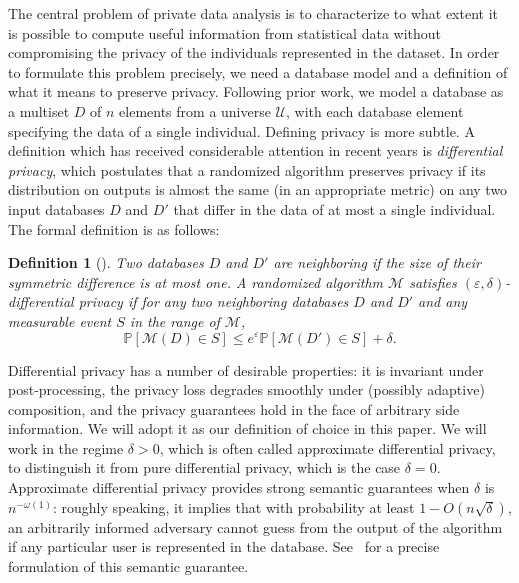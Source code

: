 \documentclass{article}
\newtheorem{definition}{Definition}[section]
\def\Pr{{\mathbb{P}}} \def\bin{{\rm bin}}
\newcommand{\alg}{\mathcal{M}}
\newcommand{\eps}{\varepsilon}
\newcommand{\univ}{U}
\newcommand\junk[1]{}
\renewcommand{\univ}{\mathcal{U}}
\begin{document}
The central problem of private data analysis is to characterize to
what extent it is possible to compute useful information from
statistical data without compromising the privacy of the individuals
represented in the dataset. In order to formulate this problem
precisely, we need a database model and a definition of what it means
to preserve privacy. Following prior work, we model a database as a
multiset $D$ of $n$ elements from a universe $\univ$\junk{, i.e.~$D
  \in \univ^n$}, with each database element specifying the data of a
single individual. Defining privacy is more subtle. A definition which
has received considerable attention in recent years is
\emph{differential privacy}, which postulates that a randomized
algorithm preserves privacy if its distribution on outputs is almost
the same (in an appropriate metric) on any two input databases $D$ and
$D'$ that differ in the data of at most a single individual. The
formal definition is as follows:
\begin{definition}[\cite{DMNS}]\label{def:DP}
  Two databases $D$ and $D'$ are \emph{neighboring} if the size of
  their symmetric difference is at most one. A randomized algorithm
  $\alg$ satisfies \emph{$(\eps, \delta)$-differential privacy} if for any
  two neighboring databases $D$ and $D'$ and any measurable event $S$
  in the range of $\alg$,
  \begin{equation*}
    \Pr[\alg(D) \in S] \leq e^{\eps}\Pr[\alg(D') \in S] + \delta.
  \end{equation*}
  \junk{Above, probabilities are taken over the internal coin tosses of $\alg$.}
\end{definition}
Differential privacy has a number of desirable properties: it is
invariant under post-processing, the privacy loss degrades smoothly
under (possibly adaptive) composition, and the privacy guarantees hold
in the face of arbitrary side information. We will adopt it as our
definition of choice in this paper. We will work in the regime $\delta
> 0$, which is often called approximate differential privacy, to
distinguish it from pure differential privacy, which is the case
$\delta=0$. Approximate differential privacy provides strong semantic
guarantees when $\delta$ is  $n^{-\omega(1)}$: roughly speaking,
it implies that with probability at least $1 - O(n\sqrt{\delta})$, an
arbitrarily informed adversary cannot guess from the output of the
algorithm if any particular user is represented in the
database. See~\cite{GantaKS08} for a precise formulation of this
semantic guarantee.
\end{document}
